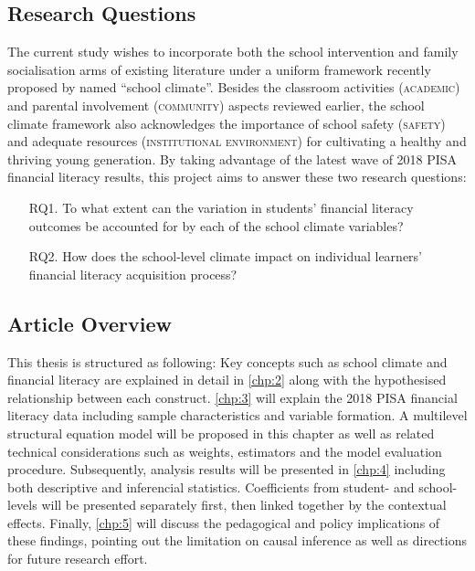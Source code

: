 \subsection{Research Questions}\label{sec:rq}

The current study wishes to incorporate both the school intervention and family socialisation arms of existing literature under a uniform framework recently proposed by \citet{wang:2016} named ``school climate''. Besides the classroom activities (\textsc{academic}) and parental involvement (\textsc{community}) aspects reviewed earlier, the school climate framework also acknowledges the importance of school safety (\textsc{safety}) and adequate resources (\textsc{institutional environment}) for cultivating a healthy and thriving young generation. By taking advantage of the latest wave of 2018 PISA financial literacy results, this project aims to answer these two research questions:
\begin{enumerate}
    \item[RQ1.] To what extent can the variation in students' financial literacy outcomes be accounted for by each of the school climate variables?
    \item[RQ2.] How does the school-level climate impact on individual learners' financial literacy acquisition process?
\end{enumerate}

\subsection{Article Overview}

This thesis is structured as following: Key concepts such as school climate and financial literacy are explained in detail in \cref{chp:2} along with the hypothesised relationship between each construct. \cref{chp:3} will explain the 2018 PISA financial literacy data including sample characteristics and variable formation. A multilevel structural equation model will be proposed in this chapter as well as related technical considerations such as weights, estimators and the model evaluation procedure. Subsequently, analysis results will be presented in \cref{chp:4} including both descriptive and inferencial statistics. Coefficients from student- and school-levels will be presented separately first, then linked together by the contextual effects. Finally, \cref{chp:5} will discuss the pedagogical and policy implications of these findings, pointing out the limitation on causal inference as well as directions for future research effort.
